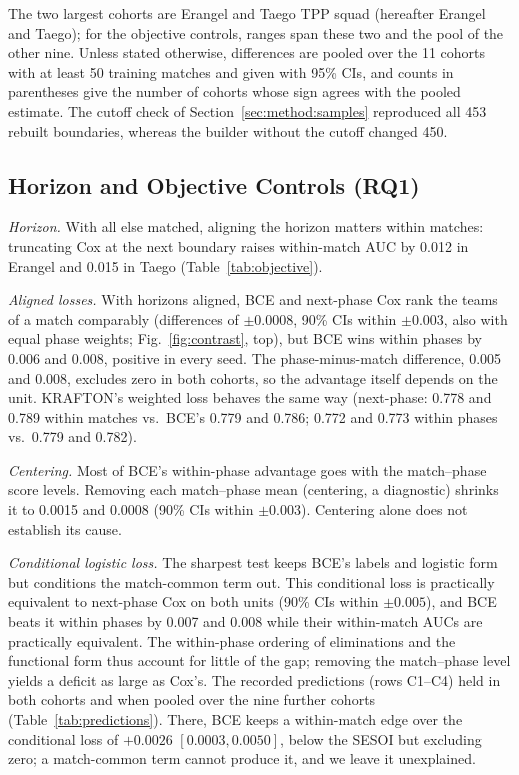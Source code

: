 \documentclass[sigconf,anonymous]{acmart}
\begin{document}
The two largest cohorts are Erangel and Taego TPP squad (hereafter Erangel and Taego); for the objective controls, ranges span these two and the pool of the other nine. Unless stated otherwise, differences are pooled over the 11 cohorts with at least 50 training matches and given with 95\% CIs, and counts in parentheses give the number of cohorts whose sign agrees with the pooled estimate. The cutoff check of Section~\ref{sec:method:samples} reproduced all 453 rebuilt boundaries, whereas the builder without the cutoff changed 450.

\subsection{Horizon and Objective Controls (RQ1)}
\label{sec:results:rq1}
\emph{Horizon.} With all else matched, aligning the horizon matters within matches: truncating Cox at the next boundary raises within-match AUC by 0.012 in Erangel and 0.015 in Taego (Table~\ref{tab:objective}).

\emph{Aligned losses.} With horizons aligned, BCE and next-phase Cox rank the teams of a match comparably (differences of $\pm0.0008$, 90\% CIs within $\pm0.003$, also with equal phase weights; Fig.~\ref{fig:contrast}, top), but BCE wins within phases by 0.006 and 0.008, positive in every seed. The phase-minus-match difference, 0.005 and 0.008, excludes zero in both cohorts, so the advantage itself depends on the unit. KRAFTON's weighted loss behaves the same way (next-phase: 0.778 and 0.789 within matches vs.\ BCE's 0.779 and 0.786; 0.772 and 0.773 within phases vs.\ 0.779 and 0.782).

\emph{Centering.} Most of BCE's within-phase advantage goes with the match--phase score levels. Removing each match--phase mean (centering, a diagnostic) shrinks it to 0.0015 and 0.0008 (90\% CIs within $\pm0.003$). Centering alone does not establish its cause.

\emph{Conditional logistic loss.} The sharpest test keeps BCE's labels and logistic form but conditions the match-common term out. This conditional loss is practically equivalent to next-phase Cox on both units (90\% CIs within $\pm0.005$), and BCE beats it within phases by 0.007 and 0.008 while their within-match AUCs are practically equivalent. The within-phase ordering of eliminations and the functional form thus account for little of the gap; removing the match--phase level yields a deficit as large as Cox's. The recorded predictions (rows C1--C4) held in both cohorts and when pooled over the nine further cohorts (Table~\ref{tab:predictions}). There, BCE keeps a within-match edge over the conditional loss of $+0.0026$ $[0.0003,\allowbreak 0.0050]$, below the SESOI but excluding zero; a match-common term cannot produce it, and we leave it unexplained.
\end{document}

